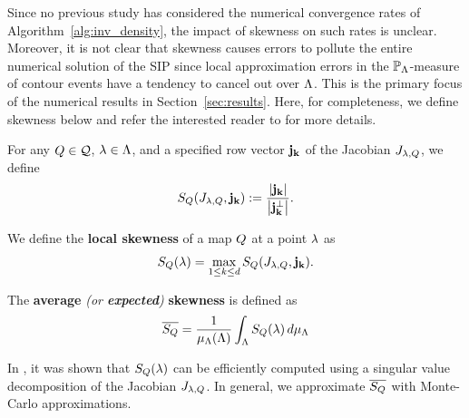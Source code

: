 Since no previous study has considered the numerical convergence rates of Algorithm~\ref{alg:inv_density}, the impact of skewness on such rates is unclear.
Moreover, it is not clear that skewness causes errors to pollute the entire numerical solution of the SIP since local approximation errors in the $\mathbb{P}_{\Lambda}$-measure of contour events have a tendency to cancel out over ${\Lambda}$.
This is the primary focus of the numerical results in Section~\ref{sec:results}.
Here, for completeness, we define skewness below and refer the interested reader to \cite{BGE+15, BPW17} for more details.


\begin{defn}
For any $Q\in\mathcal{Q}$, $\lambda \in {\Lambda}$, and a specified row vector $\bf{j}_k$ of the Jacobian $J_{\lambda, Q}$, we define
\begin{equation}
S_Q(J_{\lambda,Q}, \bf{j}_k) := \frac{\left\vert\bf{j}_k\right\vert }{\left\vert\bf{j}_k^\perp\right\vert}.
\label{eq:skewness}
\end{equation}

We define the \textbf{local skewness} of a map $Q$ at a point $\lambda$ as
\begin{equation}
S_Q(\lambda) = \max_{1\leq k \leq d} S_Q(J_{\lambda,Q}, \bf{j}_k).
\label{eq:localskewness}
\end{equation}
\end{defn}

\begin{defn}
The \textbf{average} \emph{(or \textbf{expected})} \textbf{skewness} is defined as
\begin{equation}
\overline{S_Q} = \frac{1}{\mu_{{\Lambda}}({\Lambda})} \int_{\Lambda} S_Q (\lambda) \, d\mu_{{\Lambda}}
\label{eq:avgskew}
\end{equation}
\end{defn}

In \cite{BPW17}, it was shown that $S_Q(\lambda)$ can be efficiently computed using a singular value decomposition of the Jacobian $J_{\lambda,Q}$.
In general, we approximate $\overline{S_Q}$ with Monte-Carlo approximations.



